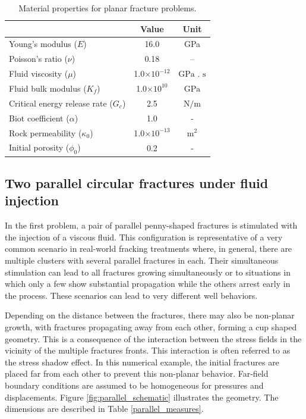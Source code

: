 \begin{table}[h]
  \centering
  \caption{Material properties for planar fracture problems.}
  \begin{tabular}[t]{lcc}
  \hline
  &Value &Unit \\
  \hline
  Young's modulus ($E$)&16.0&GPa\\
  Poisson's ratio ($\nu$)&0.18&--\\
  Fluid viscosity ($\mu$)&1.0$\times10^{-12}$&$\text{GPa . s}$\\
  Fluid bulk modulus ($K_f$)&1.0$\times10^{10}$&$\text{GPa}$\\
  Critical energy release rate ($G_c$)&2.5&$\text{N/m}$\\
  Biot coefficient ($\alpha$)&1.0&$\text{ - }$\\
  Rock permeability ($\kappa_0$)&1.0$\times 10^{-13}$&$\text{m}^2$\\
  Initial porosity ($\phi_0$)&0.2&$\text{-}$\\
  \hline
  \end{tabular}
  \label{material properties ch4}
\end{table}%

\subsection{Two parallel circular fractures under fluid injection}

In the first problem, a pair of parallel penny-shaped fractures is stimulated with the injection of a viscous fluid. This configuration is representative of a very common scenario in real-world fracking treatments where, in general, there are multiple clusters with several parallel fractures in each. Their simultaneous stimulation can lead to all fractures growing simultaneously or to situations in which only a few show substantial propagation while the others arrest early in the process. These scenarios can lead to very different well behaviors.   

Depending on the distance between the fractures, there may also be non-planar growth, with fractures propagating away from each other, forming a cup shaped geometry. This is a consequence of the interaction between the stress fields in the vicinity of the multiple fractures fronts. This interaction is often referred to as the stress shadow effect. In this numerical example, the initial fractures are placed far from each other to prevent this non-planar behavior. Far-field boundary conditions are assumed to be homogeneous for pressures and displacements. Figure \ref{fig:parallel_schematic} illustrates the geometry. The dimensions are described in Table \ref{parallel_measures}.


